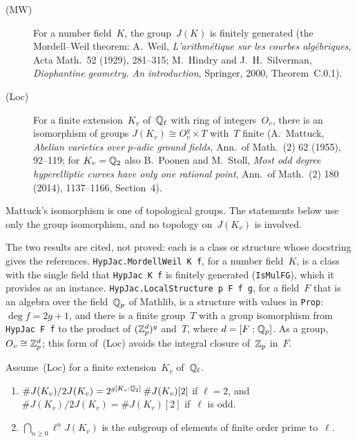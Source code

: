 \begin{definition}
\label{def:ds-cited}
\leanok
\begin{description}
  \item[\textmd{(MW)}] For a number field~$K$, the group~$J(K)$ is finitely generated (the
    Mordell--Weil theorem: A.~Weil, \emph{L'arithm\'etique sur les courbes alg\'ebriques}, Acta
    Math.~52 (1929), 281--315; M.~Hindry and J.~H.~Silverman, \emph{Diophantine geometry. An
    introduction}, Springer, 2000, Theorem~C.0.1).
  \item[\textmd{(Loc)}] For a finite extension~$K_v$ of~$\mathbb{Q}_\ell$ with ring of
    integers~$O_v$, there is an isomorphism of groups $J(K_v) \cong O_v^g \times T$ with~$T$
    finite (A.~Mattuck, \emph{Abelian varieties over $p$-adic ground fields}, Ann.\ of Math.~(2)
    62 (1955), 92--119; for $K_v = \mathbb{Q}_2$ also B.~Poonen and M.~Stoll, \emph{Most odd degree
    hyperelliptic curves have only one rational point}, Ann.\ of Math.~(2) 180 (2014),
    1137--1166, Section~4).
\end{description}
\end{definition}

Mattuck's isomorphism is one of topological groups. The statements below use only the group
isomorphism, and no topology on~$J(K_v)$ is involved.

\begin{remark}[Formalization]
The two results are cited, not proved: each is a class or structure whose docstring gives the
references. \texttt{HypJac.MordellWeil K f}, for a number field~$K$, is a class with the single
field that \texttt{HypJac K f} is finitely generated (\texttt{IsMulFG}), which it provides as an
instance. \texttt{HypJac.LocalStructure p F f g}, for a field~$F$ that is an algebra over the
field~$\mathbb{Q}_p$ of Mathlib, is a structure with values in \texttt{Prop}: $\deg f = 2g + 1$, and there
is a finite group~$T$ with a group isomorphism from \texttt{HypJac F f} to the product of
$(\mathbb{Z}_p^d)^g$ and~$T$, where $d = [F : \mathbb{Q}_p]$. As a group, $O_v \cong \mathbb{Z}_p^d$; this form
of~(Loc) avoids the integral closure of~$\mathbb{Z}_p$ in~$F$.
\end{remark}

\begin{lemma}
\label{lem:ds-loc}
\leanok
{}
Assume~(Loc) for a finite extension~$K_v$ of~$\mathbb{Q}_\ell$.
\begin{enumerate}
  \item $\#J(K_v)/2J(K_v) = 2^{g[K_v : \mathbb{Q}_2]}\,\#J(K_v)[2]$ if $\ell = 2$, and
    $\#J(K_v)/2J(K_v) = \#J(K_v)[2]$ if~$\ell$ is odd.
  \item $\bigcap_{n \ge 0} \ell^nJ(K_v)$ is the subgroup of elements of finite order prime
    to~$\ell$.
\end{enumerate}
\end{lemma}

